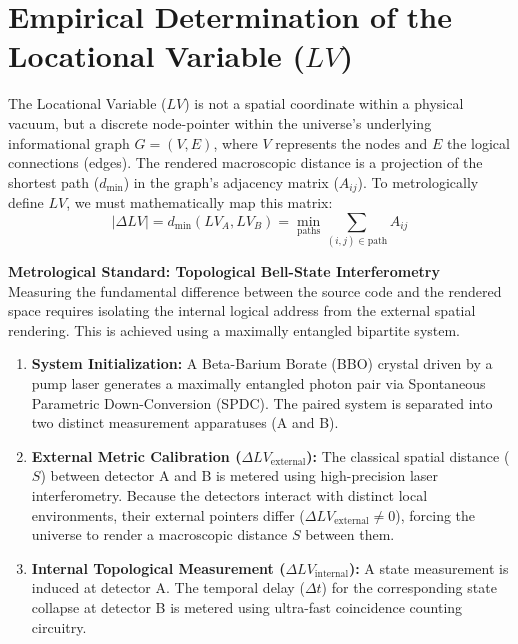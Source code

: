 \documentclass[12pt,a4paper]{article}
\begin{document}
\section{Empirical Determination of the Locational Variable ($LV$)}
The Locational Variable ($LV$) is not a spatial coordinate within a physical vacuum, but a discrete node-pointer within the universe's underlying informational graph $G = (V, E)$, where $V$ represents the nodes and $E$ the logical connections (edges). The rendered macroscopic distance is a projection of the shortest path ($d_{\mathrm{min}}$) in the graph's adjacency matrix ($A_{ij}$). To metrologically define $LV$, we must mathematically map this matrix:
\begin{equation}
|\Delta LV| = d_{\mathrm{min}}(LV_A, LV_B) = \min_{\mathrm{paths}} \sum_{(i,j) \in \mathrm{path}} A_{ij}
\end{equation}

\textbf{Metrological Standard: Topological Bell-State Interferometry} \\
Measuring the fundamental difference between the source code and the rendered space requires isolating the internal logical address from the external spatial rendering. This is achieved using a maximally entangled bipartite system.

\begin{enumerate}
    \item \textbf{System Initialization:} A Beta-Barium Borate (BBO) crystal driven by a pump laser generates a maximally entangled photon pair via Spontaneous Parametric Down-Conversion (SPDC). The paired system is separated into two distinct measurement apparatuses (A and B).
    \item \textbf{External Metric Calibration ($\Delta LV_{\mathrm{external}}$):} The classical spatial distance ($S$) between detector A and B is metered using high-precision laser interferometry. Because the detectors interact with distinct local environments, their external pointers differ ($\Delta LV_{\mathrm{external}} \neq 0$), forcing the universe to render a macroscopic distance $S$ between them.
    \item \textbf{Internal Topological Measurement ($\Delta LV_{\mathrm{internal}}$):} A state measurement is induced at detector A. The temporal delay ($\Delta t$) for the corresponding state collapse at detector B is metered using ultra-fast coincidence counting circuitry.
\end{enumerate}
\end{document}
